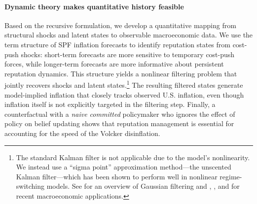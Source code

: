 \documentclass[12pt,letter,leqno]{article}
\theoremstyle{asn}
\theoremstyle{lem}
\theoremstyle{slem}
\theoremstyle{prop}
\theoremstyle{appprop}
\theoremstyle{rem}
\theoremstyle{defn}
\begin{document}
\paragraph{Dynamic theory makes quantitative history feasible}
Based on the recursive formulation, we develop a quantitative mapping from structural shocks and latent states to observable macroeconomic data. We use the term structure of SPF inflation forecasts to identify reputation states from cost-push shocks: short-term forecasts are more sensitive to temporary cost-push forces, while longer-term forecasts are more informative about persistent reputation dynamics. This structure yields a nonlinear filtering problem that jointly recovers shocks and latent states.\footnote{The standard Kalman filter is not applicable due to the model’s nonlinearity. We instead use a “sigma point” approximation method—the unscented Kalman filter—which has been shown to perform well in nonlinear regime-switching models. See \cite{sarkka_bayesian_2023} for an overview of Gaussian filtering and \cite{binning_sigma_2015}, \cite{benigno_estimating_2020}, and \cite{Foerster_learning_2022} for recent macroeconomic applications.} The resulting filtered states generate model-implied inflation that closely tracks observed U.S. inflation, even though inflation itself is not explicitly targeted in the filtering step. Finally, a counterfactual with a \textit{naive committed} policymaker who ignores the effect of policy on belief updating shows that reputation management is essential for accounting for the speed of the Volcker disinflation.
\end{document}
